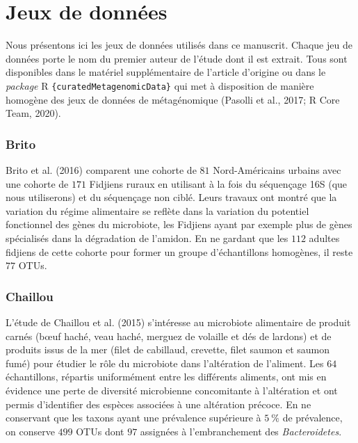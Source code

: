 \documentclass[12pt,a4paper]{reedthesis}
\theoremstyle{definition}
\theoremstyle{definition}
\theoremstyle{definition}
\theoremstyle{remark}
\begin{document}
\hypertarget{jeuxdonnees}{%
\section{Jeux de données}\label{jeuxdonnees}}

Nous présentons ici les jeux de données utilisés dans ce manuscrit. Chaque jeu de données porte le nom du premier auteur de l'étude dont il est extrait. Tous sont disponibles dans le matériel supplémentaire de l'article d'origine ou dans le \emph{package} R \texttt{\{curatedMetagenomicData\}} qui met à disposition de manière homogène des jeux de données de métagénomique (Pasolli et al., 2017; R Core Team, 2020).

\hypertarget{brito}{%
\subsubsection*{Brito}\label{brito}}

Brito et al. (2016) comparent une cohorte de \(81\) Nord-Américains urbains avec une cohorte de \(171\) Fidjiens ruraux en utilisant à la fois du séquençage 16S (que nous utiliserons) et du séquençage non ciblé. Leurs travaux ont montré que la variation du régime alimentaire se reflète dans la variation du potentiel fonctionnel des gènes du microbiote, les Fidjiens ayant par exemple plus de gènes spécialisés dans la dégradation de l'amidon. En ne gardant que les \(112\) adultes fidjiens de cette cohorte pour former un groupe d'échantillons homogènes, il reste \(77\) OTUs.

\hypertarget{chaillou}{%
\subsubsection*{Chaillou}\label{chaillou}}

L'étude de Chaillou et al. (2015) s'intéresse au microbiote alimentaire de produit carnés (bœuf haché, veau haché, merguez de volaille et dés de lardons) et de produits issus de la mer (filet de cabillaud, crevette, filet saumon et saumon fumé) pour étudier le rôle du microbiote dans l'altération de l'aliment. Les \(64\) échantillons, répartis uniformément entre les différents aliments, ont mis en évidence une perte de diversité microbienne concomitante à l'altération et ont permis d'identifier des espèces associées à une altération précoce. En ne conservant que les taxons ayant une prévalence supérieure à \(5~\%\) de prévalence, on conserve \(499\) OTUs dont \(97\) assignées à l'embranchement des \emph{Bacteroidetes}.
\end{document}

